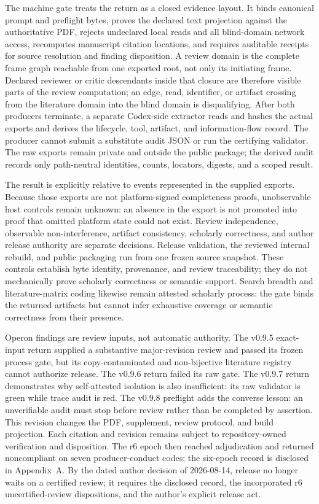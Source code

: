 \documentclass[11pt]{article}
\begin{document}
  The machine gate treats the return as a closed evidence layout. It binds
  canonical prompt and preflight bytes, proves the declared text projection
  against the authoritative PDF, rejects undeclared local reads and all
  blind-domain network access, recomputes manuscript citation locations, and
  requires auditable receipts for source resolution and finding disposition.
  A review domain is the complete frame graph reachable from one exported root,
  not only its initiating frame. Declared reviewer or critic descendants inside
  that closure are therefore visible parts of the review computation; an edge,
  read, identifier, or artifact crossing from the literature domain into the
  blind domain is disqualifying. After both producers terminate, a separate
  Codex-side extractor reads and hashes the actual exports and derives the
  lifecycle, tool, artifact, and information-flow record. The producer cannot
  submit a substitute audit JSON or run the certifying validator. The raw
  exports remain private and outside the public package; the derived audit
  records only path-neutral identities, counts, locators, digests, and a scoped
  result.

  The result is explicitly relative to events represented in the supplied
  exports. Because those exports are not platform-signed completeness proofs,
  unobservable host controls remain unknown: an absence in the export is not
  promoted into proof that omitted platform state could not exist. Review
  independence, observable non-interference, artifact consistency, scholarly
  correctness, and author release authority are separate decisions.
  Release validation, the reviewed internal rebuild, and public packaging run
  from one frozen source snapshot. These controls establish byte identity,
  provenance, and review traceability; they do not mechanically prove
  scholarly correctness or semantic support.
  Search breadth and literature-matrix coding likewise remain attested
  scholarly process: the gate binds the returned artifacts but cannot infer
  exhaustive coverage or semantic correctness from their presence.

  Operon findings are review inputs, not automatic authority. The v0.9.5
  exact-input return supplied a substantive major-revision review and passed
  its frozen process gate, but its copy-contaminated and non-bijective
  literature registry cannot authorize release. The v0.9.6 return failed its
  raw gate. The v0.9.7 return demonstrates why self-attested isolation is also
  insufficient: its raw validator is green while trace audit is red. The
  v0.9.8 preflight adds the converse lesson: an unverifiable audit must stop
  before review rather than be completed by assertion. This revision changes
  the PDF, supplement, review protocol, and build projection. Each citation and
  revision remains subject to repository-owned verification and disposition.
  The r6 epoch then reached adjudication and returned noncompliant on seven
  producer-conduct codes; the six-epoch record is disclosed in Appendix~A.
  By the dated author decision of 2026-08-14, release no longer waits on a
  certified review; it requires the disclosed record, the incorporated r6
  uncertified-review dispositions, and the author's explicit release act.
\else
  \ifdefined\VerifiedLiterature
\end{document}
